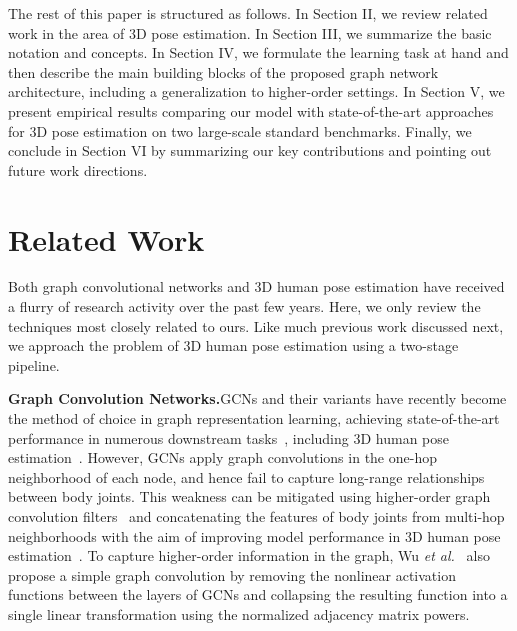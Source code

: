 \documentclass[10pt,journal]{IEEEtran}
\begin{document}
\medskip\noindent The rest of this paper is structured as follows. In Section II, we review related work in the area of 3D pose estimation. In Section III, we summarize the basic notation and concepts. In Section IV, we formulate the learning task at hand and then describe the main building blocks of the proposed graph network architecture, including a generalization to higher-order settings. In Section V, we present empirical results comparing our model with state-of-the-art approaches for 3D pose estimation on two large-scale standard benchmarks. Finally, we conclude in Section VI by summarizing our key contributions and pointing out future work directions.

\section{Related Work}
Both graph convolutional networks and 3D human pose estimation have received a flurry of research activity over the past few years. Here, we only review the techniques most closely related to ours. Like much previous work discussed next, we approach the problem of 3D human pose estimation using a two-stage pipeline.

\medskip\noindent\textbf{Graph Convolution Networks.}\quad GCNs and their variants have recently become the method of choice in graph representation learning, achieving state-of-the-art performance in numerous downstream tasks~\cite{defferrard2016convolutional,Kipf:17,Velickovic:17,chen2020simple}, including 3D human pose estimation~\cite{zhao2019semantic,zou2021modulated,liu2020comprehensive,Ailing2021Hard}. However, GCNs apply graph convolutions in the one-hop neighborhood of each node, and hence fail to capture long-range relationships between body joints. This weakness can be mitigated using higher-order graph convolution filters~\cite{abu2019mixhop} and concatenating the features of body joints from multi-hop neighborhoods with the aim of improving model performance in 3D human pose estimation~\cite{zou2020high,quan2021higher}. To capture higher-order information in the graph, Wu \textit{et al.}~\cite{FWu:19} also propose a simple graph convolution by removing the nonlinear activation functions between the layers of GCNs and collapsing the resulting function into a single linear transformation using the normalized adjacency matrix powers.
\end{document}
